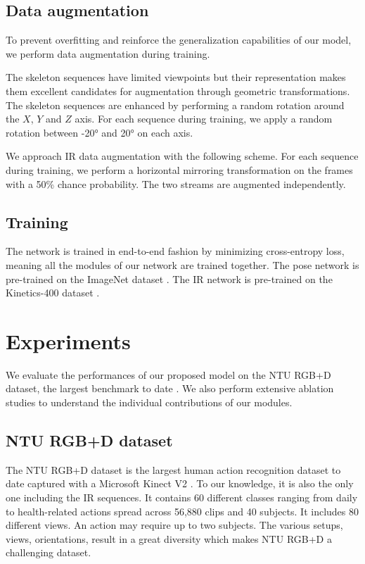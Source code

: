 \documentclass[letterpaper, 10 pt, conference]{ieeeconf}
\begin{document}
\subsection{Data augmentation}

To prevent overfitting and reinforce the generalization capabilities of our model, we perform data augmentation during training. 

The skeleton sequences have limited viewpoints but their representation makes them excellent candidates for augmentation through geometric transformations. The skeleton sequences are enhanced by performing a random rotation around the $X$, $Y$ and $Z$ axis. For each sequence during training, we apply a random rotation between \ang{-20} and \ang{20} on each axis. 

We approach IR data augmentation with the following scheme. For each sequence during training, we perform a horizontal mirroring transformation on the frames with a 50\% chance probability. The two streams are augmented independently. 

\subsection{Training}

The network is trained in end-to-end fashion by minimizing cross-entropy loss, meaning all the modules of our network are trained together. The pose network is pre-trained on the ImageNet dataset \cite{deng2009imagenet}. The IR network is pre-trained on the Kinetics-400 dataset \cite{carreira2017quo}. 






\section{Experiments}

We evaluate the performances of our proposed model on the NTU RGB+D dataset, the largest benchmark to date \cite{shahroudy2016ntu}. We also perform extensive ablation studies to understand the individual contributions of our modules.

\subsection{NTU RGB+D dataset}

The NTU RGB+D dataset is the largest human action recognition dataset to date captured with a Microsoft Kinect V2 \cite{zhang2012microsoft}. To our knowledge, it is also the only one including the IR sequences. It contains 60 different classes ranging from daily to health-related actions spread across 56,880 clips and 40 subjects. It includes 80 different views. An action may require up to two subjects. The various setups, views, orientations, result in a great diversity which makes NTU RGB+D a challenging dataset. 
\end{document}
